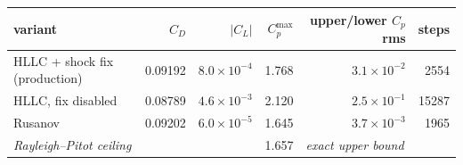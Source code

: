 \footnotesize
\begin{tabular}{lrrrrr}
\toprule
variant & $C_D$ & $|C_L|$ & $C_p^{\max}$ & upper/lower $C_p$ rms & steps\\
\midrule
HLLC + shock fix (production) & 0.09192 & $8.0\times 10^{-4}$ & 1.768 & $3.1\times 10^{-2}$ & 2554\\
HLLC, fix disabled & 0.08789 & $4.6\times 10^{-3}$ & 2.120 & $2.5\times 10^{-1}$ & 15287\\
Rusanov & 0.09202 & $6.0\times 10^{-5}$ & 1.645 & $3.7\times 10^{-3}$ & 1965\\
\midrule\multicolumn{3}{l}{\emph{Rayleigh--Pitot ceiling}} & 1.657 & \multicolumn{2}{l}{\emph{exact upper bound}}\\
\bottomrule
\end{tabular}
